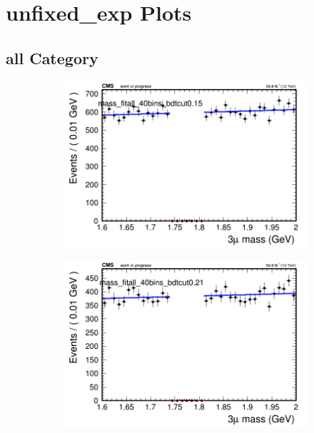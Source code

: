 \section{unfixed\_exp Plots}

\subsection{all Category}
\label{sec:unfixedexpall}

\begin{figure}[H]
    \centering
    \begin{subfigure}{0.2\textwidth}
        \includegraphics[width=\textwidth]{unfixed_exp/plots/all/massfit_all_40bins_bdtcut0.15.png}
        \caption{}
    \end{subfigure}
    \begin{subfigure}{0.2\textwidth}
        \includegraphics[width=\textwidth]{unfixed_exp/plots/all/massfit_all_40bins_bdtcut0.21.png}

\end{subfigure}
\end{figure}
